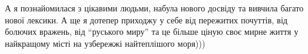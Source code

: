 А я познайомилася з цікавими людьми, набула нового досвіду та вивчила багато
нової лексики. А ще я дотепер приходжу у себе від пережитих почуттів, від
болючих вражень, від \enquote{руського миру} та це більше ціную своє мирне життя у
найкращому місті на узбережжі найтеплішого моря)))

